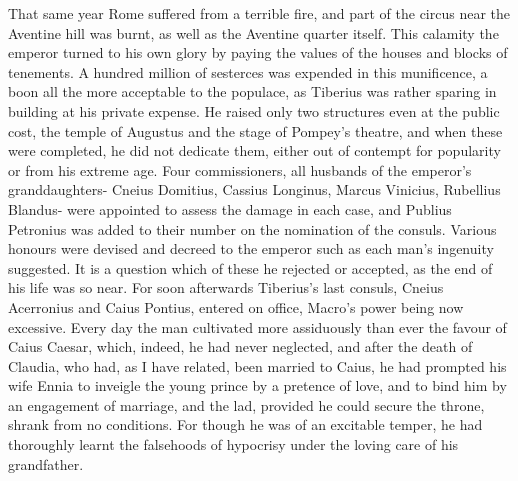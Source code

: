 That same year Rome suffered from a terrible fire, and part of the circus near the Aventine hill was burnt, as well as the Aventine quarter itself. This calamity the emperor turned to his own glory by paying the values of the houses and blocks of tenements. A hundred million of sesterces was expended in this munificence, a boon all the more acceptable to the populace, as Tiberius was rather sparing in building at his private expense. He raised only two structures even at the public cost, the temple of Augustus and the stage of Pompey's theatre, and when these were completed, he did not dedicate them, either out of contempt for popularity or from his extreme age. Four commissioners, all husbands of the emperor's granddaughters- Cneius Domitius, Cassius Longinus, Marcus Vinicius, Rubellius Blandus- were appointed to assess the damage in each case, and Publius Petronius was added to their number on the nomination of the consuls. Various honours were devised and decreed to the emperor such as each man's ingenuity suggested. It is a question which of these he rejected or accepted, as the end of his life was so near. For soon afterwards Tiberius's last consuls, Cneius Acerronius and Caius Pontius, entered on office, Macro's power being now excessive. Every day the man cultivated more assiduously than ever the favour of Caius Caesar, which, indeed, he had never neglected, and after the death of Claudia, who had, as I have related, been married to Caius, he had prompted his wife Ennia to inveigle the young prince by a pretence of love, and to bind him by an engagement of marriage, and the lad, provided he could secure the throne, shrank from no conditions. For though he was of an excitable temper, he had thoroughly learnt the falsehoods of hypocrisy under the loving care of his grandfather.


